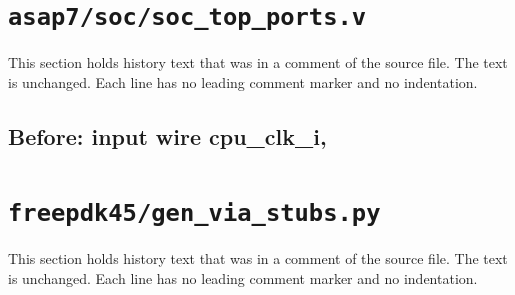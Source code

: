 \section{\texttt{asap7/soc/soc\_top\_ports.v}}\label{cr:pd:asap7-soc-soc-top-ports-v}

This section holds history text that was in a comment of the source file. The text is unchanged. Each line has no leading comment marker and no indentation.

\begin{record}

\subsection*{Before: input  wire        cpu\_clk\_i,}


\end{record}

\section{\texttt{freepdk45/gen\_via\_stubs.py}}\label{cr:pd:freepdk45-gen-via-stubs-py}

This section holds history text that was in a comment of the source file. The text is unchanged. Each line has no leading comment marker and no indentation.

